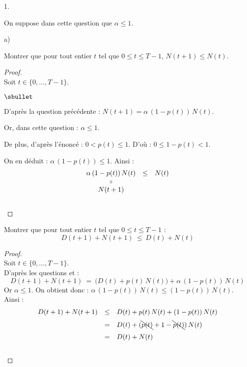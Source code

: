 \documentclass[11pt]{article}%
\begin{document}
\begin{noliste}{1.}
  \item On suppose dans cette question que $\alpha \leq 1$.
  \begin{noliste}{a)}
    \setlength{\itemsep}{2mm}
    \item Montrer que pour tout entier $t$ tel que $0 \leq t \leq T-1$,
    $N(t+1) \leq N(t)$.
    
    \begin{proof}~\\
    Soit $t \in \{0, \ldots, T-1\}$.
      \begin{noliste}{$\sbullet$}
	\item D'après la question précédente : $N(t+1) = \alpha \, (1-
	p(t)) \, N(t)$.
	
	\item Or, dans cette question : $\alpha \leq 1$.
	
	\item De plus, d'après l'énoncé : $0 < p(t) \leq 1$. D'où : 
	$0 \leq 1-p(t) <1$.
      \end{noliste}
      On en déduit : $\alpha \, (1-p(t)) \leq 1$. Ainsi :
      \[
        \begin{array}{ccc}
          \alpha \, (1-p(t)) \, N(t) & \leq & N(t)
          \\
          \shortparallel
          \\
          N(t+1)
        \end{array}
      \]
      ~\\[-1cm]
    \end{proof}

    
    \item Montrer que pour tout entier $t$ tel que $0 \leq t \leq T-1$ :
    \[
      D(t+1) + N(t+1) \ \leq \ D(t)+N(t)
    \]
    
    \begin{proof}~\\
      Soit $t\in \{0, \ldots, T-1\}$.\\
      D'après les questions  et  :
      \[
        D(t+1) + N(t+1) \ = \ \big(D(t) + p(t) \, N(t)\big) + 
        \alpha \, (1-p(t)) \, N(t)
      \]
      Or $\alpha \leq 1$. On obtient donc : $ \alpha \, (1-p(t)) \, 
      N(t) \leq (1-p(t)) \, N(t)$.\\
      Ainsi :
      \[
       \begin{array}{rcl}
        D(t+1) + N(t+1) & \leq & D(t) + p(t) \, N(t) + (1-p(t)) \, N(t)
        \\[.2cm]
        &=& D(t) + (\bcancel{p(t)} + 1 - \bcancel{p(t)}) \, N(t)
        \\[.2cm]
        &=& D(t) + N(t)
       \end{array}
      \]
      ~\\[-1cm]
    \end{proof}
    

\end{noliste}
\end{noliste}
\end{document}
